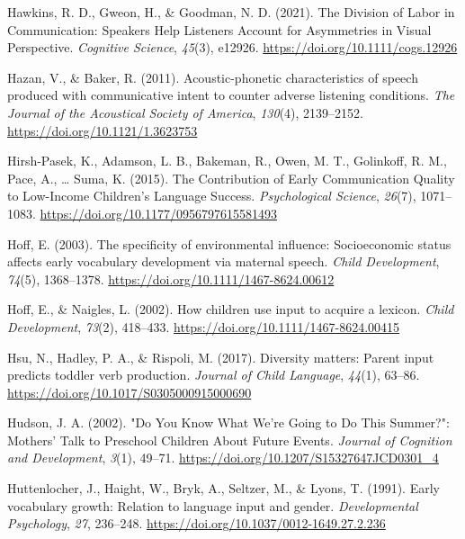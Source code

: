 \documentclass[
  man]{apa6}
\newlength{\cslhangindent}
\newlength{\cslentryspacingunit} %
\newenvironment{CSLReferences}[2] %
 {%
  \setlength{\parindent}{0pt}
  \ifodd #1
  \let\oldpar\par
  \def\par{\hangindent=\cslhangindent\oldpar}
  \fi
  \setlength{\parskip}{#2\cslentryspacingunit}
 }%
 {}
\begin{document}
\begin{CSLReferences}{1}{0}
\leavevmode{}%
Hawkins, R. D., Gweon, H., \& Goodman, N. D. (2021). The {Division} of {Labor} in {Communication}: {Speakers} {Help} {Listeners} {Account} for {Asymmetries} in {Visual} {Perspective}. \emph{Cognitive Science}, \emph{45}(3), e12926. \url{https://doi.org/10.1111/cogs.12926}

\leavevmode{}%
Hazan, V., \& Baker, R. (2011). Acoustic-phonetic characteristics of speech produced with communicative intent to counter adverse listening conditions. \emph{The Journal of the Acoustical Society of America}, \emph{130}(4), 2139--2152. \url{https://doi.org/10.1121/1.3623753}

\leavevmode{}%
Hirsh-Pasek, K., Adamson, L. B., Bakeman, R., Owen, M. T., Golinkoff, R. M., Pace, A., \ldots{} Suma, K. (2015). The {Contribution} of {Early} {Communication} {Quality} to {Low}-{Income} {Children}'s {Language} {Success}. \emph{Psychological Science}, \emph{26}(7), 1071--1083. \url{https://doi.org/10.1177/0956797615581493}

\leavevmode{}%
Hoff, E. (2003). The specificity of environmental influence: Socioeconomic status affects early vocabulary development via maternal speech. \emph{Child Development}, \emph{74}(5), 1368--1378. \url{https://doi.org/10.1111/1467-8624.00612}

\leavevmode{}%
Hoff, E., \& Naigles, L. (2002). How children use input to acquire a lexicon. \emph{Child Development}, \emph{73}(2), 418--433. \url{https://doi.org/10.1111/1467-8624.00415}

\leavevmode{}%
Hsu, N., Hadley, P. A., \& Rispoli, M. (2017). Diversity matters: Parent input predicts toddler verb production. \emph{Journal of Child Language}, \emph{44}(1), 63--86. \url{https://doi.org/10.1017/S0305000915000690}

\leavevmode{}%
Hudson, J. A. (2002). "{Do} {You} {Know} {What} {We}'re {Going} to {Do} {This} {Summer}?": {Mothers}' {Talk} to {Preschool} {Children} {About} {Future} {Events}. \emph{Journal of Cognition and Development}, \emph{3}(1), 49--71. \url{https://doi.org/10.1207/S15327647JCD0301_4}

\leavevmode{}%
Huttenlocher, J., Haight, W., Bryk, A., Seltzer, M., \& Lyons, T. (1991). Early vocabulary growth: {Relation} to language input and gender. \emph{Developmental Psychology}, \emph{27}, 236--248. \url{https://doi.org/10.1037/0012-1649.27.2.236}


\end{CSLReferences}
\end{document}
